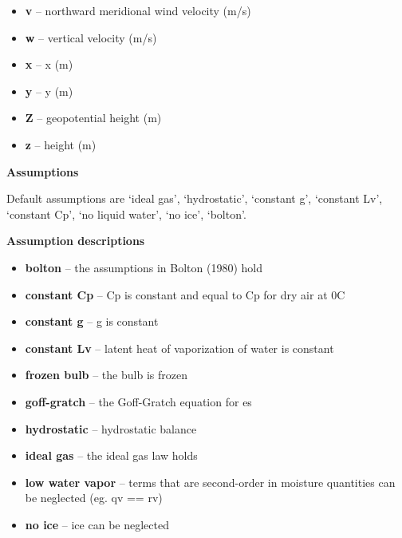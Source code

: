 \documentclass[letterpaper,10pt,english]{sphinxmanual}
\begin{document}
\begin{fulllineitems}
\begin{itemize}
\item {} 
\textbf{v} -- northward meridional wind velocity (m/s)

\item {} 
\textbf{w} -- vertical velocity (m/s)

\item {} 
\textbf{x} -- x (m)

\item {} 
\textbf{y} -- y (m)

\item {} 
\textbf{Z} -- geopotential height (m)

\item {} 
\textbf{z} -- height (m)

\end{itemize}

\textbf{Assumptions}

Default assumptions are `ideal gas', `hydrostatic', `constant g', `constant Lv',
`constant Cp', `no liquid water', `no ice', `bolton'.

\textbf{Assumption descriptions}
\begin{itemize}
\item {} 
\textbf{bolton} -- the assumptions in Bolton (1980) hold

\item {} 
\textbf{constant Cp} -- Cp is constant and equal to Cp for dry air at 0C

\item {} 
\textbf{constant g} -- g is constant

\item {} 
\textbf{constant Lv} -- latent heat of vaporization of water is constant

\item {} 
\textbf{frozen bulb} -- the bulb is frozen

\item {} 
\textbf{goff-gratch} -- the Goff-Gratch equation for es

\item {} 
\textbf{hydrostatic} -- hydrostatic balance

\item {} 
\textbf{ideal gas} -- the ideal gas law holds

\item {} 
\textbf{low water vapor} -- terms that are second-order in moisture quantities can be neglected (eg. qv == rv)

\item {} 
\textbf{no ice} -- ice can be neglected


\end{itemize}
\end{fulllineitems}
\end{document}
